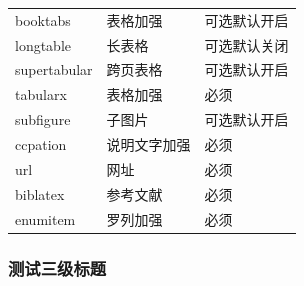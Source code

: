 \documentclass[twoside,maketable]{cauthesis}
\begin{document}
\begin{table}[htbp]
\begin{supertabular}{lll}
            booktabs&表格加强&可选默认开启\\
            longtable&长表格&可选默认关闭\\
            supertabular&跨页表格&可选默认开启\\
            tabularx&表格加强&必须\\
            subfigure&子图片&可选默认开启\\
            ccpation&说明文字加强&必须\\
            url&网址&必须\\
            biblatex&参考文献&必须\\
            enumitem&罗列加强&必须\\
            \hline
        \end{supertabular}
    \end{table}

    \subsubsection{测试三级标题}

    \printbibliography%
\end{document}
